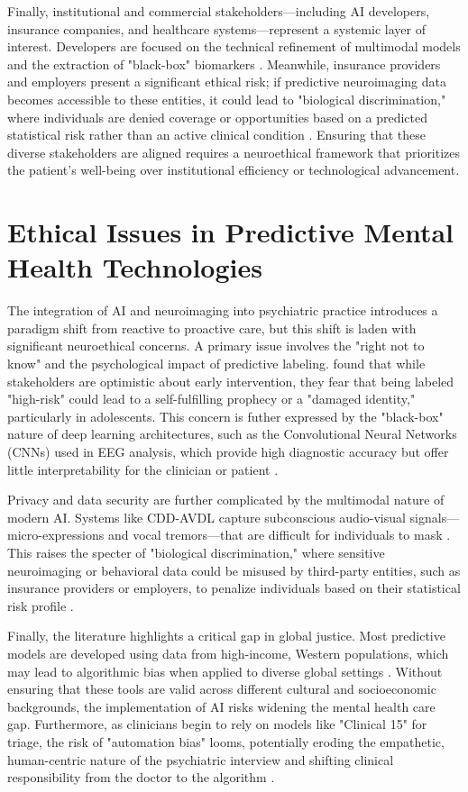 \documentclass[12pt]{article}
\begin{document}
Finally, institutional and commercial stakeholders—including AI developers, insurance companies, and healthcare systems—represent a systemic layer of interest. Developers are focused on the technical refinement of multimodal models and the extraction of "black-box" biomarkers \citep{ahire2025, liu2025}. Meanwhile, insurance providers and employers present a significant ethical risk; if predictive neuroimaging data becomes accessible to these entities, it could lead to "biological discrimination," where individuals are denied coverage or opportunities based on a predicted statistical risk rather than an active clinical condition \citep{ricci2025}. Ensuring that these diverse stakeholders are aligned requires a neuroethical framework that prioritizes the patient’s well-being over institutional efficiency or technological advancement.

\section{Ethical Issues in Predictive Mental Health Technologies}

The integration of AI and neuroimaging into psychiatric practice introduces a paradigm shift from reactive to proactive care, but this shift is laden with significant neuroethical concerns. A primary issue involves the "right not to know" and the psychological impact of predictive labeling. \citet{kohrt2025} found that while stakeholders are optimistic about early intervention, they fear that being labeled "high-risk" could lead to a self-fulfilling prophecy or a "damaged identity," particularly in adolescents. This concern is futher expressed by the "black-box" nature of deep learning architectures, such as the Convolutional Neural Networks (CNNs) used in EEG analysis, which provide high diagnostic accuracy but offer little interpretability for the clinician or patient \citep{ahire2025, weber2025}.

Privacy and data security are further complicated by the multimodal nature of modern AI. Systems like CDD-AVDL capture subconscious audio-visual signals—micro-expressions and vocal tremors—that are difficult for individuals to mask \citep{liu2025}. This raises the specter of "biological discrimination," where sensitive neuroimaging or behavioral data could be misused by third-party entities, such as insurance providers or employers, to penalize individuals based on their statistical risk profile \citep{ricci2025}. 

Finally, the literature highlights a critical gap in global justice. Most predictive models are developed using data from high-income, Western populations, which may lead to algorithmic bias when applied to diverse global settings \citep{kohrt2025, ricci2025}. Without ensuring that these tools are valid across different cultural and socioeconomic backgrounds, the implementation of AI risks widening the mental health care gap. Furthermore, as clinicians begin to rely on models like "Clinical 15" for triage, the risk of "automation bias" looms, potentially eroding the empathetic, human-centric nature of the psychiatric interview and shifting clinical responsibility from the doctor to the algorithm \citep{eder2026, ricci2025}.
\end{document}
